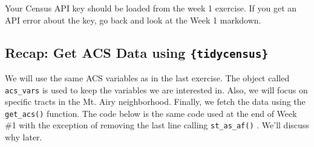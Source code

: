 \documentclass[
]{article}
\begin{document}
Your Census API key should be loaded from the week 1 exercise. If you
get an API error about the key, go back and look at the Week 1 markdown.

\hypertarget{recap-get-acs-data-using-tidycensus}{%
\subsection{\texorpdfstring{Recap: Get ACS Data using
\texttt{\{tidycensus\}}}{Recap: Get ACS Data using \{tidycensus\}}}\label{recap-get-acs-data-using-tidycensus}}

We will use the same ACS variables as in the last exercise. The object
called \texttt{acs\_vars} is used to keep the variables we are
interested in. Also, we will focus on specific tracts in the Mt. Airy
neighborhood. Finally, we fetch the data using the \texttt{get\_acs()}
function. The code below is the same code used at the end of Week \#1
with the exception of removing the last line calling
\texttt{st\_as\_af()} . We'll discuss why later.
\end{document}
